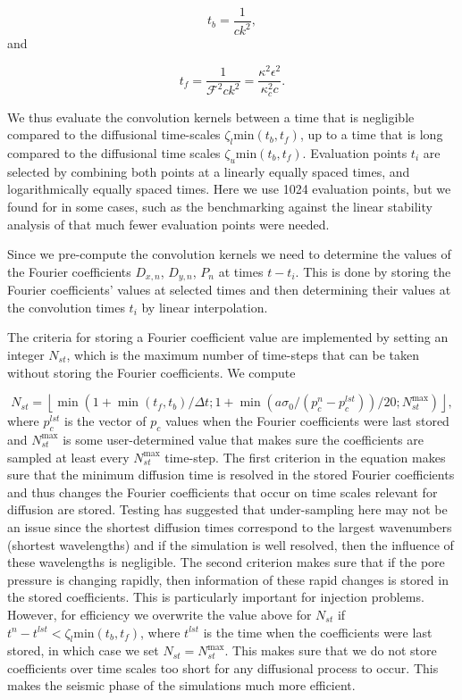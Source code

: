 \documentclass[draft]{agujournal2019}
\begin{document}
\begin{equation}
    t_{b} = \frac{1}{c k^2},
    \label{eq:tb}
\end{equation}
 and
 
\begin{equation}
    t_{f} = \frac{1}{\mathcal{F}^2 c k^2} = \frac{\kappa^2 \epsilon^2}{\kappa_c^2 c }.
    \label{eq:tf}
\end{equation}

We thus evaluate the convolution kernels between a time that is negligible compared to the diffusional time-scales $\zeta_l \text{min} (t_b, t_f)$, up to a time that is long compared to the diffusional time scales $\zeta_u \text{min} (t_b, t_f)$. Evaluation points $t_i$ are selected by combining both points at a linearly equally spaced times, and logarithmically equally spaced times. Here we use 1024 evaluation points, but we found for in some cases, such as the benchmarking against the linear stability analysis of  that much fewer evaluation points were needed.

Since we pre-compute the convolution kernels we need to determine the values of the Fourier coefficients $D_{x,n}$, $D_{y,n}$, $P_{n}$ at times $t-t_i$. This is done by storing the Fourier coefficients' values at selected times and then determining their values at the convolution times $t_i$ by linear interpolation. 

The criteria for storing a Fourier coefficient value are implemented by setting an integer $N_{st}$, which is the maximum number of time-steps that can be taken without storing the Fourier coefficients. We compute 

\begin{equation}
   N_{st} = \left \lfloor \min ( 1 + \min(t_f,t_b)/ \Delta t ; 1 + \min(a  \sigma_0 / (p_c^n - p_c^{lst} ) )/20;  N_{st}^{\max}  ) \right \rfloor,
\end{equation}
where $p_c^{lst}$ is the vector of $p_c$ values when the Fourier coefficients were last stored and  $N_{st}^{\max}$ is some user-determined value that makes sure the coefficients are sampled at least every $N_{st}^{\max}$ time-step. The first criterion in the equation makes sure that the minimum diffusion time is resolved in the stored Fourier coefficients and thus changes the Fourier coefficients that occur on time scales relevant for diffusion are stored. Testing has suggested that under-sampling here may not be an issue since the shortest diffusion times correspond to the largest wavenumbers (shortest wavelengths) and if the simulation is well resolved, then the influence of these wavelengths is negligible. The second criterion makes sure that if the pore pressure is changing rapidly, then information of these rapid changes is stored in the stored coefficients. This is particularly important for injection problems. However, for efficiency we overwrite the value above for $N_{st}$ if $t^n - t^{lst} < \zeta_l \text{min} (t_b, t_f)$, where $t^{lst}$ is the time when the coefficients were last stored, in which case we set $N_{st} = N_{st}^{\max}$. This makes sure that we do not store coefficients over time scales too short for any diffusional process to occur. This makes the seismic phase of the simulations much more efficient. 
\end{document}
